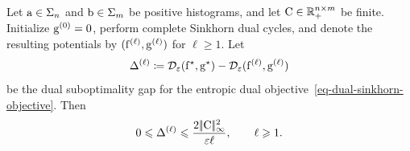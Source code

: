 \begin{prop}\label{prop-sinkhorn-dual-rate}
	Let $\mathrm{a}\in\Sigma_n$ and $\mathrm{b}\in\Sigma_m$ be positive histograms, and let $\mathrm{C}\in\mathbb{R}_+^{n\times m}$ be finite.
	Initialize $\mathrm{g}^{(0)}=0$, perform complete Sinkhorn dual cycles, and denote the resulting potentials by $(\mathrm{f}^{(\ell)},\mathrm{g}^{(\ell)})$ for $\ell\geq1$. Let
	\[
		\Delta^{(\ell)}
		\coloneqq
		\mathcal{D}_\varepsilon(\mathrm{f}^\star,\mathrm{g}^\star)
		-
		\mathcal{D}_\varepsilon(\mathrm{f}^{(\ell)},\mathrm{g}^{(\ell)})
	\]
	be the dual suboptimality gap for the entropic dual objective~\eqref{eq-dual-sinkhorn-objective}. Then
	\[
		0\leqslant\Delta^{(\ell)}\leqslant \frac{2|\!| \mathrm{C} |\!|_\infty^2}{\varepsilon \ell},
		\qquad \ell\geqslant1.
	\]
\end{prop}

